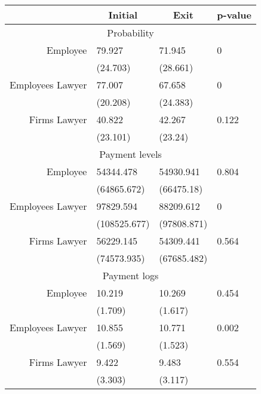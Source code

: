\begin{tabular}{rrrr}
\toprule
      & \multicolumn{1}{c}{Initial} & \multicolumn{1}{c}{Exit} & \multicolumn{1}{c}{p-value} \\
\midrule
\multicolumn{4}{c}{Probability} \\
\midrule
\midrule
Employee  & \multicolumn{1}{l}{79.927} & \multicolumn{1}{l}{71.945} & \multicolumn{1}{l}{0} \\
      & \multicolumn{1}{l}{(24.703)} & \multicolumn{1}{l}{(28.661)} & \multicolumn{1}{l}{} \\
Employees Lawyer & \multicolumn{1}{l}{77.007} & \multicolumn{1}{l}{67.658} & \multicolumn{1}{l}{0} \\
      & \multicolumn{1}{l}{(20.208)} & \multicolumn{1}{l}{(24.383)} & \multicolumn{1}{l}{} \\
Firms Lawyer & \multicolumn{1}{l}{40.822} & \multicolumn{1}{l}{42.267} & \multicolumn{1}{l}{0.122} \\
      & \multicolumn{1}{l}{(23.101)} & \multicolumn{1}{l}{(23.24)} & \multicolumn{1}{l}{} \\
      \midrule
\multicolumn{4}{c}{Payment levels} \\
\midrule
\midrule
Employee  & \multicolumn{1}{l}{54344.478} & \multicolumn{1}{l}{54930.941} & \multicolumn{1}{l}{0.804} \\
      & \multicolumn{1}{l}{(64865.672)} & \multicolumn{1}{l}{(66475.18)} & \multicolumn{1}{l}{} \\
Employees Lawyer & \multicolumn{1}{l}{97829.594} & \multicolumn{1}{l}{88209.612} & \multicolumn{1}{l}{0} \\
      & \multicolumn{1}{l}{(108525.677)} & \multicolumn{1}{l}{(97808.871)} & \multicolumn{1}{l}{} \\
Firms Lawyer & \multicolumn{1}{l}{56229.145} & \multicolumn{1}{l}{54309.441} & \multicolumn{1}{l}{0.564} \\
      & \multicolumn{1}{l}{(74573.935)} & \multicolumn{1}{l}{(67685.482)} & \multicolumn{1}{l}{} \\
      \midrule
\multicolumn{4}{c}{Payment logs} \\
\midrule
\midrule
Employee  & \multicolumn{1}{l}{10.219} & \multicolumn{1}{l}{10.269} & \multicolumn{1}{l}{0.454} \\
      & \multicolumn{1}{l}{(1.709)} & \multicolumn{1}{l}{(1.617)} & \multicolumn{1}{l}{} \\
Employees Lawyer & \multicolumn{1}{l}{10.855} & \multicolumn{1}{l}{10.771} & \multicolumn{1}{l}{0.002} \\
      & \multicolumn{1}{l}{(1.569)} & \multicolumn{1}{l}{(1.523)} & \multicolumn{1}{l}{} \\
Firms Lawyer & \multicolumn{1}{l}{9.422} & \multicolumn{1}{l}{9.483} & \multicolumn{1}{l}{0.554} \\
      & \multicolumn{1}{l}{(3.303)} & \multicolumn{1}{l}{(3.117)} & \multicolumn{1}{l}{} \\
\bottomrule
\end{tabular}%
